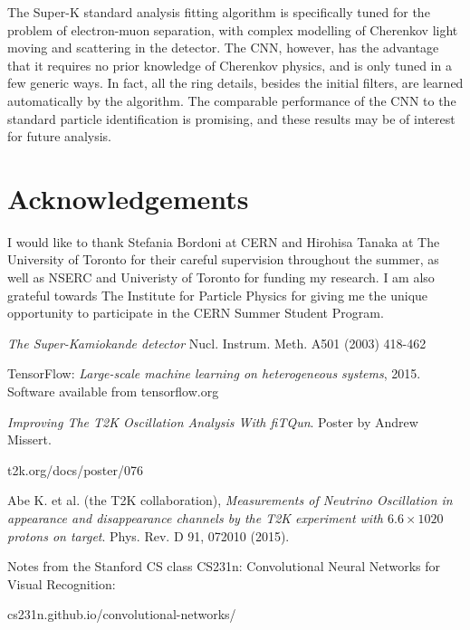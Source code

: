 \documentclass[twoside,twocolumn]{article}
\begin{document}
The Super-K standard analysis fitting algorithm is specifically tuned for the problem of electron-muon separation, with complex modelling of Cherenkov light moving and scattering in the detector. The CNN, however, has the advantage that it requires no prior knowledge of Cherenkov physics, and is only tuned in a few generic ways. In fact, all the ring details, besides the initial filters, are learned automatically by the algorithm. The comparable performance of the CNN to the standard particle identification is promising, and these results may be of interest for future analysis.

\section{Acknowledgements}

I would like to thank Stefania Bordoni at CERN and Hirohisa Tanaka at The University of Toronto for their careful supervision throughout the summer, as well as NSERC and Univeristy of Toronto for funding my research. I am also grateful towards The Institute for Particle Physics for giving me the unique opportunity to participate in the CERN Summer Student Program.


\begin{thebibliography}{99} %

\textit{The Super-Kamiokande detector} Nucl. Instrum. Meth. A501 (2003) 418-462

TensorFlow: \textit{Large-scale machine learning on heterogeneous systems},
2015. Software available from tensorflow.org

\textit{Improving The T2K Oscillation Analysis With fiTQun}. Poster by Andrew Missert.

t2k.org/docs/poster/076

Abe K. et al. (the T2K collaboration), \textit{Measurements of Neutrino Oscillation in appearance and disappearance channels by the T2K experiment with $6.6\times 1020$ protons on target}. Phys. Rev. D 91, 072010 (2015). 

Notes from the Stanford CS class CS231n: Convolutional Neural Networks for Visual Recognition: 

cs231n.github.io/convolutional-networks/


\end{thebibliography}

\end{document}
